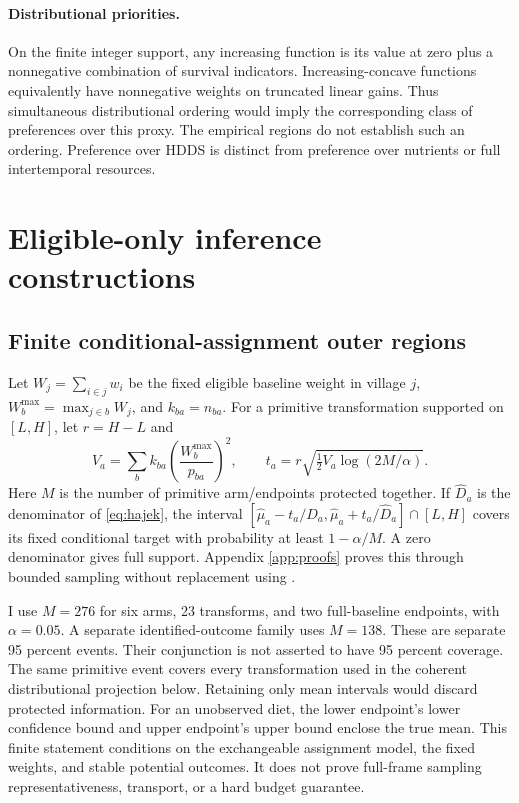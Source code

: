 \documentclass[11pt]{article}
\begin{document}
\paragraph{Distributional priorities.}
On the finite integer support, any increasing function is its value at zero plus a nonnegative combination of survival indicators. Increasing-concave functions equivalently have nonnegative weights on truncated linear gains. Thus simultaneous distributional ordering would imply the corresponding class of preferences over this proxy. The empirical regions do not establish such an ordering. Preference over HDDS is distinct from preference over nutrients or full intertemporal resources.

\section{Eligible-only inference constructions}\label{app:eligiblemethods}

\subsection{Finite conditional-assignment outer regions}

Let $W_j=\sum_{i\in j}w_i$ be the fixed eligible baseline weight in village $j$, $W_b^{\max}=\max_{j\in b}W_j$, and $k_{ba}=n_{ba}$. For a primitive transformation supported on $[L,H]$, let $r=H-L$ and
\begin{equation}
 V_a=\sum_b k_{ba}\left(\frac{W_b^{\max}}{p_{ba}}\right)^2,
 \qquad t_a=r\sqrt{\tfrac12 V_a\log(2M/\alpha)}.\label{eq:finite}
\end{equation}
Here $M$ is the number of primitive arm/endpoints protected together. If $\widehat D_a$ is the denominator of \eqref{eq:hajek}, the interval $[\widehat\mu_a-t_a/\widehat D_a,\widehat\mu_a+t_a/\widehat D_a]\cap[L,H]$ covers its fixed conditional target with probability at least $1-\alpha/M$. A zero denominator gives full support. Appendix \ref{app:proofs} proves this through bounded sampling without replacement using \citet{hoeffding1963}.

I use $M=276$ for six arms, 23 transforms, and two full-baseline endpoints, with $\alpha=0.05$. A separate identified-outcome family uses $M=138$. These are separate 95 percent events. Their conjunction is not asserted to have 95 percent coverage. The same primitive event covers every transformation used in the coherent distributional projection below. Retaining only mean intervals would discard protected information. For an unobserved diet, the lower endpoint's lower confidence bound and upper endpoint's upper bound enclose the true mean. This finite statement conditions on the exchangeable assignment model, the fixed weights, and stable potential outcomes. It does not prove full-frame sampling representativeness, transport, or a hard budget guarantee.
\end{document}
